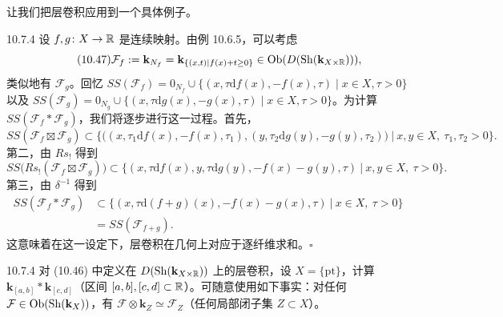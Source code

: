 让我们把层卷积应用到一个具体例子。

\begin{wexam}{10.7.4}
  设 $f,g\colon X\to\mathbb{R}$ 是连续映射。由例 10.6.5，可以考虑
  \begin{equation}\tag{10.47}
    \mathcal F_f:=\mathbf{k}_{N_f}
    =\mathbf{k}_{\{(x,t)\mid f(x)+t\ge0\}}
    \in\operatorname{Ob}(D(\operatorname{Sh}(\mathbf{k}_{X\times\mathbb{R}}))),
  \end{equation}
  类似地有 $\mathcal F_g$。回忆
  $SS(\mathcal F_f)=0_{N_f}\cup
  \{(x,\tau\mathrm df(x),-f(x),\tau)\mid x\in X,\tau>0\}$ 以及
  $SS(\mathcal F_g)=0_{N_g}\cup
  \{(x,\tau\mathrm dg(x),-g(x),\tau)\mid x\in X,\tau>0\}$。为计算
  $SS(\mathcal F_f*\mathcal F_g)$，我们将逐步进行这一过程。首先，
  \[
    SS(\mathcal F_f\boxtimes\mathcal F_g)\subset
    \bigl\{\bigl((x,\tau_1\mathrm df(x),-f(x),\tau_1),
    (y,\tau_2\mathrm dg(y),-g(y),\tau_2)\bigr)\ \big|\
    x,y\in X,\ \tau_1,\tau_2>0\bigr\}.
  \]
  第二，由 $Rs_!$ 得到
  \[
    SS\bigl(Rs_!(\mathcal F_f\boxtimes\mathcal F_g)\bigr)\subset
    \bigl\{(x,\tau\mathrm df(x),y,\tau\mathrm dg(y),-f(x)-g(y),\tau)\ \big|\
    x,y\in X,\ \tau>0\bigr\}.
  \]
  第三，由 $\delta^{-1}$ 得到
  \begin{align*}
    SS(\mathcal F_f*\mathcal F_g)
    &\subset\bigl\{(x,\tau\mathrm d(f+g)(x),-f(x)-g(x),\tau)\ \big|\
      x\in X,\ \tau>0\bigr\}\\
    &=SS(\mathcal F_{f+g}).
  \end{align*}
  这意味着在这一设定下，层卷积在几何上对应于逐纤维求和。\hfill$\square$
\end{wexam}

\begin{wexer}{10.7.4}
  对 (10.46) 中定义在 $D(\operatorname{Sh}(\mathbf{k}_{X\times\mathbb{R}}))$ 上的层卷积，设
  $X=\{\mathrm{pt}\}$，计算 $\mathbf{k}_{[a,b]}*\mathbf{k}_{[c,d]}$（区间
  $[a,b],[c,d]\subset\mathbb{R}$）。可随意使用如下事实：对任何
  $\mathcal F\in\operatorname{Ob}(\operatorname{Sh}(\mathbf{k}_X))$，有
  $\mathcal F\otimes\mathbf{k}_Z\simeq\mathcal F_Z$（任何局部闭子集
  $Z\subset X$）。
\end{wexer}

